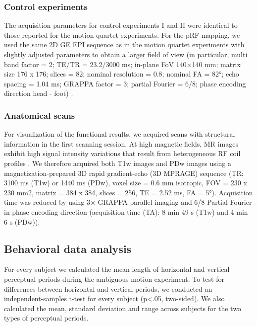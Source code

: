 \subsubsection{Control experiments}
The acquisition parameters for control experiments I and II were identical to those reported for the motion quartet experiments. For the pRF mapping, we used the same 2D GE EPI sequence as in the motion quartet experiments with slightly adjusted parameters to obtain a larger field of view (in particular, multi band factor = 2; TE/TR = 23.2/3000 ms; in-plane FoV 140×140 mm; matrix size 176 x 176; slices = 82; nominal resolution = 0.8; nominal FA = 82°; echo spacing = 1.04 ms; GRAPPA factor = 3; partial Fourier = 6/8; phase encoding direction head - foot) \parencite{Moeller2010, Setsompop2012, Feinberg2010}.

\subsubsection{Anatomical scans}
For visualization of the functional results, we acquired scans with structural information in the first scanning session. At high magnetic fields, MR images exhibit high signal intensity variations that result from heterogeneous RF coil profiles \parencite{Moortele2009}. We therefore acquired both T1w images and PDw images using a magnetization-prepared 3D rapid gradient-echo (3D MPRAGE) sequence (TR: 3100 ms (T1w) or 1440 ms (PDw), voxel size = 0.6 mm isotropic, FOV = 230 x 230 mm2, matrix = 384 x 384, slices = 256, TE = 2.52 ms, FA = 5°). Acquisition time was reduced by using 3× GRAPPA parallel imaging and 6/8 Partial Fourier in phase encoding direction (acquisition time (TA): 8 min 49 s (T1w) and 4 min 6 s (PDw)).

\subsection{Behavioral data analysis}
For every subject we calculated the mean length of horizontal and vertical perceptual periods during the ambiguous motion experiment. To test for differences between horizontal and vertical periods, we conducted an independent-samples t-test for every subject (p\textless.05, two-sided). We also calculated the mean, standard deviation and range across subjects for the two types of perceptual periods.

